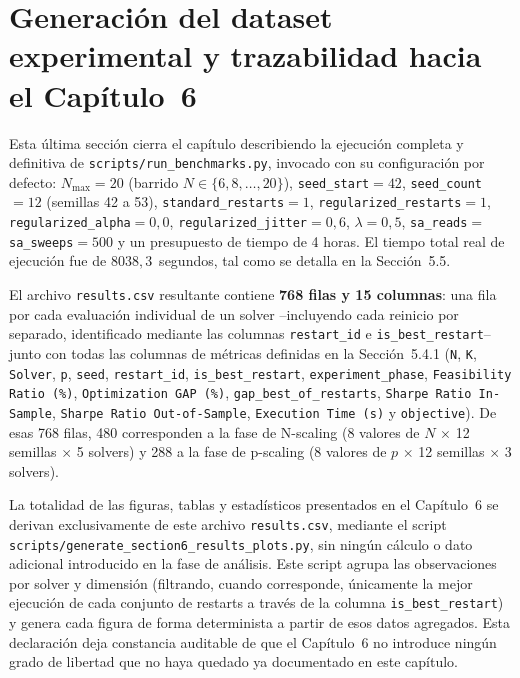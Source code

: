 \section{Generación del dataset experimental y trazabilidad hacia el Capítulo~6}
\label{sec:dataset-final}

Esta última sección cierra el capítulo describiendo la ejecución completa y definitiva de \texttt{scripts/run\_benchmarks.py}, invocado con su configuración por defecto:
$N_{\max}=20$ (barrido $N \in \{6,8,\dots,20\}$), \texttt{seed\_start}$=42$, \texttt{seed\_count}$=12$ (semillas 42 a 53), \texttt{standard\_restarts}$=1$, \texttt{regularized\_restarts}$=1$, \texttt{regularized\_alpha}$=0{,}0$, \texttt{regularized\_jitter}$=0{,}6$, $\lambda=0{,}5$, \texttt{sa\_reads}$=$\texttt{sa\_sweeps}$=500$ y un presupuesto de tiempo de 4 horas. El tiempo total real de ejecución fue de $8038{,}3$~segundos, tal como se detalla en la Sección~5.5.

El archivo \texttt{results.csv} resultante contiene \textbf{768 filas y 15 columnas}: una fila por cada evaluación individual de un solver --incluyendo cada reinicio por separado, identificado mediante las columnas \texttt{restart\_id} e \texttt{is\_best\_restart}-- junto con todas las columnas de métricas definidas en la Sección~5.4.1 (\texttt{N}, \texttt{K}, \texttt{Solver}, \texttt{p}, \texttt{seed}, \texttt{restart\_id}, \texttt{is\_best\_restart}, \texttt{experiment\_phase}, \texttt{Feasibility Ratio (\%)}, \texttt{Optimization GAP (\%)}, \texttt{gap\_best\_of\_restarts}, \texttt{Sharpe Ratio In-Sample}, \texttt{Sharpe Ratio Out-of-Sample}, \texttt{Execution Time (s)} y \texttt{objective}). De esas 768 filas, 480 corresponden a la fase de N-scaling (8 valores de $N$ $\times$ 12 semillas $\times$ 5 solvers) y 288 a la fase de p-scaling (8 valores de $p$ $\times$ 12 semillas $\times$ 3 solvers).

La totalidad de las figuras, tablas y estadísticos presentados en el Capítulo~6 se derivan exclusivamente de este archivo \texttt{results.csv}, mediante el script \texttt{scripts/generate\_section6\_results\_plots.py}, sin ningún cálculo o dato adicional introducido en la fase de análisis. Este script agrupa las observaciones por solver y dimensión (filtrando, cuando corresponde, únicamente la mejor ejecución de cada conjunto de restarts a través de la columna \texttt{is\_best\_restart}) y genera cada figura de forma determinista a partir de esos datos agregados. Esta declaración deja constancia auditable de que el Capítulo~6 no introduce ningún grado de libertad que no haya quedado ya documentado en este capítulo.
